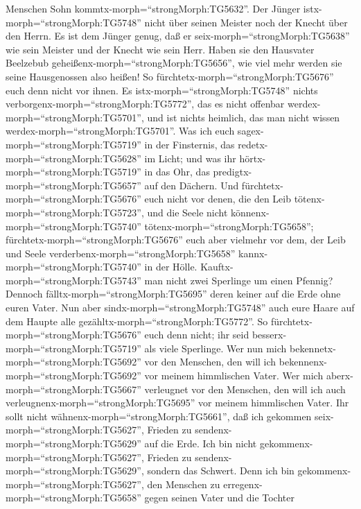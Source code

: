 Menschen Sohn kommtx-morph=``strongMorph:TG5632''.  Der
Jünger istx-morph=``strongMorph:TG5748'' nicht über seinen Meister noch
der Knecht über den Herrn.  Es ist dem Jünger genug, daß er
seix-morph=``strongMorph:TG5638'' wie sein Meister und der Knecht wie
sein Herr. Haben sie den Hausvater Beelzebub
geheißenx-morph=``strongMorph:TG5656'', wie viel mehr werden sie seine
Hausgenossen also heißen!  So
fürchtetx-morph=``strongMorph:TG5676'' euch denn nicht vor ihnen. Es
istx-morph=``strongMorph:TG5748'' nichts
verborgenx-morph=``strongMorph:TG5772'', das es nicht offenbar
werdex-morph=``strongMorph:TG5701'', und ist nichts heimlich, das man
nicht wissen werdex-morph=``strongMorph:TG5701''.  Was ich
euch sagex-morph=``strongMorph:TG5719'' in der Finsternis, das
redetx-morph=``strongMorph:TG5628'' im Licht; und was ihr
hörtx-morph=``strongMorph:TG5719'' in das Ohr, das
predigtx-morph=``strongMorph:TG5657'' auf den Dächern.  Und
fürchtetx-morph=``strongMorph:TG5676'' euch nicht vor denen, die den
Leib tötenx-morph=``strongMorph:TG5723'', und die Seele nicht
könnenx-morph=``strongMorph:TG5740''
tötenx-morph=``strongMorph:TG5658'';
fürchtetx-morph=``strongMorph:TG5676'' euch aber vielmehr vor dem, der
Leib und Seele verderbenx-morph=``strongMorph:TG5658''
kannx-morph=``strongMorph:TG5740'' in der Hölle. 
Kauftx-morph=``strongMorph:TG5743'' man nicht zwei Sperlinge um einen
Pfennig? Dennoch fälltx-morph=``strongMorph:TG5695'' deren keiner auf
die Erde ohne euren Vater.  Nun aber
sindx-morph=``strongMorph:TG5748'' auch eure Haare auf dem Haupte alle
gezähltx-morph=``strongMorph:TG5772''.  So
fürchtetx-morph=``strongMorph:TG5676'' euch denn nicht; ihr seid
besserx-morph=``strongMorph:TG5719'' als viele Sperlinge. 
Wer nun mich bekennetx-morph=``strongMorph:TG5692'' vor den Menschen,
den will ich bekennenx-morph=``strongMorph:TG5692'' vor meinem
himmlischen Vater.  Wer mich
aberx-morph=``strongMorph:TG5667'' verleugnet vor den Menschen, den will
ich auch verleugnenx-morph=``strongMorph:TG5695'' vor meinem himmlischen
Vater.  Ihr sollt nicht
wähnenx-morph=``strongMorph:TG5661'', daß ich gekommen
seix-morph=``strongMorph:TG5627'', Frieden zu
sendenx-morph=``strongMorph:TG5629'' auf die Erde. Ich bin nicht
gekommenx-morph=``strongMorph:TG5627'', Frieden zu
sendenx-morph=``strongMorph:TG5629'', sondern das Schwert. 
Denn ich bin gekommenx-morph=``strongMorph:TG5627'', den Menschen zu
erregenx-morph=``strongMorph:TG5658'' gegen seinen Vater und die Tochter
